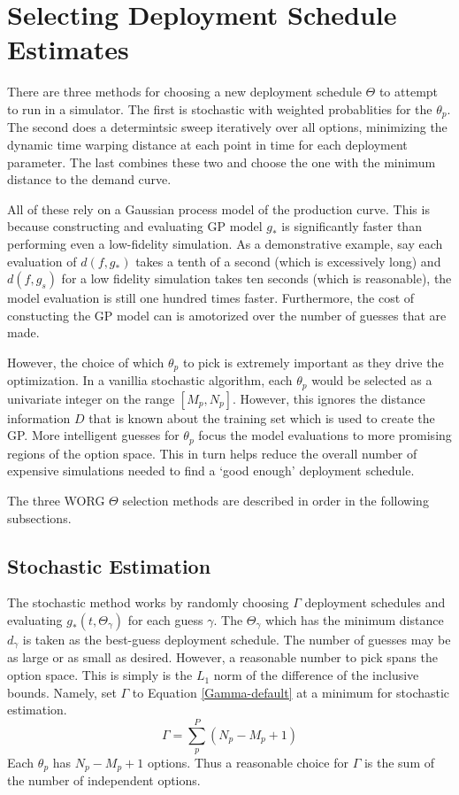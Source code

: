 \section{Selecting Deployment Schedule Estimates}
\label{selecting}

There are three methods for choosing a new deployment schedule $\Theta$ 
to attempt to run in a simulator. The first is stochastic with weighted
probablities for the $\theta_p$.  The second does a determintsic sweep 
iteratively over all options, minimizing the dynamic time warping distance
at each point in time for each deployment parameter.  The last combines
these two and choose the one with the minimum distance to the demand curve.

All of these rely on a Gaussian process model of the production
curve. This is because constructing and evaluating GP model $g_*$ is 
significantly faster than performing even a low-fidelity simulation. 
As a demonstrative example, say each evaluation of $d(f, g_*)$ takes a tenth
of a second (which is excessively long) and $d(f, g_s)$ for a low fidelity
simulation takes ten seconds (which is reasonable), the model evaluation 
is still one hundred times faster.  Furthermore, the cost of constucting 
the GP model can is amotorized over the number of guesses that are made.

However, the choice of which $\theta_p$ to pick is extremely important
as they drive the optimization. In a vanillia stochastic algorithm, 
each $\theta_p$ would be selected as a univariate integer on the 
range $[M_p, N_p]$.  However, this ignores the distance information $D$ 
that is known about the training set which is used to create the GP.
More intelligent guesses for $\theta_p$ focus the model 
evaluations to more promising regions of the option space.  This in turn 
helps reduce the overall number of expensive simulations needed to find 
a `good enough' deployment schedule.

The three WORG $\Theta$ selection methods are described in order in the 
following subsections.

\subsection{Stochastic Estimation}
\label{stochastic}

The stochastic method works by randomly choosing $\Gamma$ deployment 
schedules and evaluating $g_*(t, \Theta_\gamma)$ for each guess $\gamma$.
The $\Theta_\gamma$ which has the minimum distance $d_\gamma$ is 
taken as the best-guess deployment schedule.  The number of guesses may 
be as large or as small as desired.  However, a reasonable number to pick 
spans the option space. This is simply is the $L_1$ norm of the difference 
of the inclusive bounds. Namely, set $\Gamma$ to Equation \ref{Gamma-default}
at a minimum for stochastic estimation.
\begin{equation}
\label{Gamma-default}
\Gamma = \sum_p^P (N_p - M_p + 1)
\end{equation}
Each $\theta_p$ has $N_p - M_p + 1$ options. Thus a reasonable
choice for $\Gamma$ is the sum of the number of independent options.

